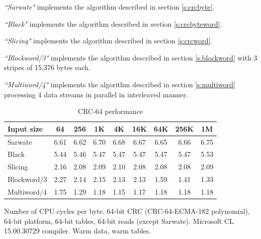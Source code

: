\documentclass{article}
\begin{document}
\begin{table}
{\it``Sarwate"} implements the algorithm described in section
\ref{s:crcbyte}.

{\it``Black"} implements the algorithm described in section
\ref{s:crcbyteword}.

{\it``Slicing"} implements the algorithm described in section
\ref{s:crcword}.

{\it``Blockword/3"} implements the algorithm described in section
\ref{s:blockword} with 3 stripes of 15,376 bytes each.

{\it``Multiword/4"} implements the algorithm described in section
\ref{s:multiword} processing 4 data streams in parallel in interleaved
manner.


\end{table}


\begin{table}
\begin{center}

\caption{CRC-64 performance} \label{t:CRC64Perf}
\begin{tabular}{| l | c | c | c | c | c | c | c | c |}
  \hline
Input size           & 64    & 256   & 1K    & 4K    & 16K   & 64K   & 256K  & 1M       \\
  \hline
             Sarwate &  6.61 &  6.62 &  6.70 &  6.68 &  6.67 &  6.65 &  6.66 &  6.75    \\
               Black &  5.44 &  5.46 &  5.47 &  5.47 &  5.47 &  5.47 &  5.47 &  5.53    \\
             Slicing &  2.16 &  2.08 &  2.09 &  2.10 &  2.08 &  2.08 &  2.08 &  2.09    \\
         Blockword/3 &  2.27 &  2.14 &  2.15 &  2.13 &  2.13 &  1.59 &  1.41 &  1.33    \\
         Multiword/4 &  1.75 &  1.29 &  1.18 &  1.15 &  1.17 &  1.18 &  1.18 &  1.18    \\
  \hline
\end{tabular}
\end{center}

Number of CPU cycles per byte. 64-bit CRC (CRC-64-ECMA-182 polynomial),
64-bit platform, 64-bit tables, 64-bit reads (except Sarwate). Microsoft CL
15.00.30729 compiler. Warm data, warm tables.


\end{table}
\end{document}
